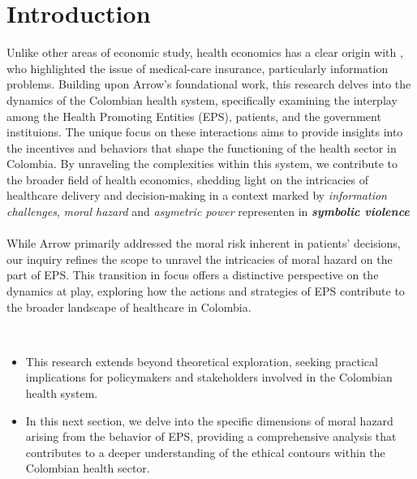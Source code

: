 \documentclass[11pt]{article}
\begin{document}
\section*{Introduction}
\begin{flushleft}
    Unlike other areas of economic study, health economics has a clear origin with \citet{arrow1963uncertainty}, who highlighted the issue of medical-care insurance, particularly information problems. Building upon Arrow's foundational work, this research delves into the dynamics of the Colombian health system, specifically examining the interplay among the Health Promoting Entities (EPS), patients, and the government instituions. The unique focus on these interactions aims to provide insights into the incentives and behaviors that shape the functioning of the health sector in Colombia. By unraveling the complexities within this system, we contribute to the broader field of health economics, shedding light on the intricacies of healthcare delivery and decision-making in a context marked by \textit{information challenges}, \textit{moral hazard} and \textit{asymetric power} representen in \textit{\textbf{symbolic violence}}\\~\\

    While Arrow primarily addressed the moral risk inherent in patients' decisions, our inquiry refines the scope to unravel the intricacies of moral hazard on the part of EPS. This transition in focus offers a distinctive perspective on the dynamics at play, exploring how the actions and strategies of EPS contribute to the broader landscape of healthcare in Colombia.\par~\par
    
    
    
    \begin{snippet}
        \begin{itemize}
            \item This research extends beyond theoretical exploration, seeking practical implications for policymakers and stakeholders involved in the Colombian health system.
            \item In this next section, we delve into the specific dimensions of moral hazard arising from the behavior of EPS, providing a comprehensive analysis that contributes to a deeper understanding of the ethical contours within the Colombian health sector.
        \end{itemize}
    \end{snippet}

\end{flushleft}

\newpage

\medskip

\nocite{*}
\printbibliography
\newpage
\end{document}
